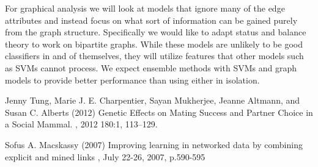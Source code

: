 \documentclass[twoside,twocolumn,paper=letter,fontsize=11pt]{article}
\begin{document}
For graphical analysis we will look at models that ignore many of the edge
attributes and instead focus on what sort of information can be gained purely
from the graph structure. Specifically we would like to adapt status and
balance theory to work on bipartite graphs. While these models are unlikely to
be good classifiers in and of themselves, they will utilize features that other
models such as SVMs cannot process. We expect ensemble methods with SVMs and
graph models to provide better performance than using either in isolation.


\begin{thebibliography}{99} %

  Jenny Tung, Marie J. E. Charpentier, Sayan Mukherjee, Jeanne Altmann, and Susan C. Alberts (2012)
\newblock 
  Genetic Effects on Mating Success and Partner Choice in a Social Mammal.
, 2012 180:1, 113--129.

Sofus A. Macskassy (2007) 
\newblock
Improving learning in networked data by combining explicit and mined links
, July 22-26, 2007, p.590-595
 
\end{thebibliography}

\end{document}
